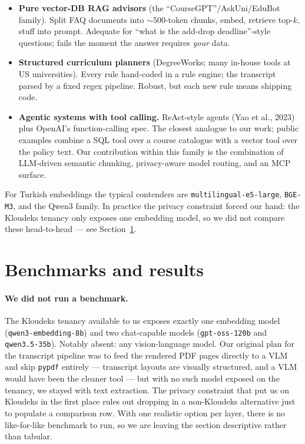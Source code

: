 \documentclass[11pt,a4paper]{article}
\begin{document}
\begin{itemize}[leftmargin=*, itemsep=0.2em]
    \item \textbf{Pure vector-DB RAG advisors} (the ``CourseGPT''/AskUni/EduBot
          family). Split FAQ documents into $\sim$500-token chunks, embed,
          retrieve top-$k$, stuff into prompt. Adequate for ``what is the
          add-drop deadline''-style questions; fails the moment the answer
          requires \emph{your} data.
    \item \textbf{Structured curriculum planners} (DegreeWorks; many in-house
          tools at US universities). Every rule hand-coded in a rule engine;
          the transcript parsed by a fixed regex pipeline. Robust, but each new
          rule means shipping code.
    \item \textbf{Agentic systems with tool calling.} ReAct-style agents
          (Yao et al., 2023) plus OpenAI's function-calling spec. The closest
          analogue to our work; public examples combine a SQL tool over a
          course catalogue with a vector tool over the policy text. Our
          contribution within this family is the combination of LLM-driven
          semantic chunking, privacy-aware model routing, and an MCP surface.
\end{itemize}

For Turkish embeddings the typical contenders are
\texttt{multilingual-e5-large}, \texttt{BGE-M3}, and the Qwen3 family. In
practice the privacy constraint forced our hand: the Kloudeks tenancy only
exposes one embedding model, so we did not compare these head-to-head ---
see Section~\ref{sec:bench}.

\section{Benchmarks and results}
\label{sec:bench}

\paragraph{We did not run a benchmark.} The Kloudeks tenancy available to us
exposes exactly one embedding model (\texttt{qwen3-embedding-8b}) and two
chat-capable models (\texttt{gpt-oss-120b} and \texttt{qwen3.5-35b}). Notably
absent: any vision-language model. Our original plan for the transcript
pipeline was to feed the rendered PDF pages directly to a VLM and skip
\texttt{pypdf} entirely --- transcript layouts are visually structured, and a
VLM would have been the cleaner tool --- but with no such model exposed on
the tenancy, we stayed with text extraction. The privacy constraint that put
us on Kloudeks in the first place rules out dropping in a non-Kloudeks
alternative just to populate a comparison row. With one realistic option per
layer, there is no like-for-like benchmark to run, so we are leaving the
section descriptive rather than tabular.
\end{document}
